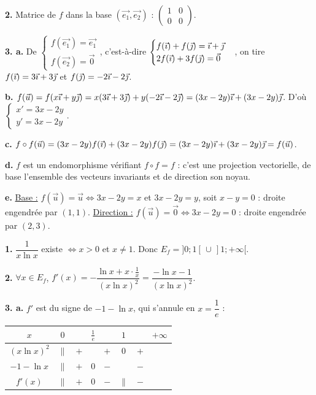 \documentclass[11pt]{article}
\begin{document}
\textbf{2.} Matrice de $f$ dans la base $(\vec{e_1}, \vec{e_2})$ : $\begin{pmatrix} 1 & 0 \\ 0 & 0 \end{pmatrix}$.

\textbf{3. a.} De $\begin{cases} f(\vec{e_1}) = \vec{e_1} \\ f(\vec{e_2}) = \vec{0} \end{cases}$, c'est-à-dire $\begin{cases} f(\vec{\imath}) + f(\vec{\jmath}) = \vec{\imath} + \vec{\jmath} \\ 2f(\vec{\imath}) + 3f(\vec{\jmath}) = \vec{0} \end{cases}$, on tire $f(\vec{\imath}) = 3\vec{\imath} + 3\vec{\jmath}$ et $f(\vec{\jmath}) = -2\vec{\imath} - 2\vec{\jmath}$.

\textbf{b.} $f(\vec{u}) = f(x\vec{\imath} + y\vec{\jmath}) = x(3\vec{\imath} + 3\vec{\jmath}) + y(-2\vec{\imath} - 2\vec{\jmath}) = (3x - 2y)\vec{\imath} + (3x - 2y)\vec{\jmath}$. D'où $\begin{cases} x' = 3x - 2y \\ y' = 3x - 2y \end{cases}$.

\textbf{c.} $f\circ f(\vec{u}) = (3x - 2y)f(\vec{\imath}) + (3x - 2y)f(\vec{\jmath}) = (3x - 2y)\vec{\imath} + (3x - 2y)\vec{\jmath} = f(\vec{u})$.

\textbf{d.} $f$ est un endomorphisme vérifiant $f \circ f = f$ : c'est une projection vectorielle, de base l'ensemble des vecteurs invariants et de direction son noyau.

\textbf{e.} \underline{Base :} $f(\vec{u}) = \vec{u} \Leftrightarrow 3x - 2y = x$ et $3x - 2y = y$, soit $x - y = 0$ : droite engendrée par $(1, 1)$. \underline{Direction :} $f(\vec{u}) = \vec{0} \Leftrightarrow 3x - 2y = 0$ : droite engendrée par $(2, 3)$.

\textbf{1.} $\dfrac{1}{x\ln x}$ existe $\Leftrightarrow x > 0$ et $x \ne 1$. Donc $E_f = ]0;1[\,\cup\,]1;+\infty[$.

\textbf{2.} $\forall x \in E_f$, $f'(x) = -\dfrac{\ln x + x\cdot\frac{1}{x}}{(x\ln x)^2} = \dfrac{-\ln x - 1}{(x\ln x)^2}$.

\textbf{3. a.} $f'$ est du signe de $-1 - \ln x$, qui s'annule en $x = \dfrac{1}{e}$ :
\begin{center}\renewcommand{\arraystretch}{1.4}
\begin{tabular}{|c|ccccccc|}
\hline $x$ & $0$ & & $\frac{1}{e}$ & & $1$ & & $+\infty$ \\\hline
$(x\ln x)^2$ & $\|$ & $+$ & & $+$ & $0$ & $+$ & \\\hline
$-1 - \ln x$ & $\|$ & $+$ & $0$ & $-$ & & $-$ & \\\hline
$f'(x)$ & $\|$ & $+$ & $0$ & $-$ & $\|$ & $-$ & \\\hline
\end{tabular}
\end{center}
\end{document}
